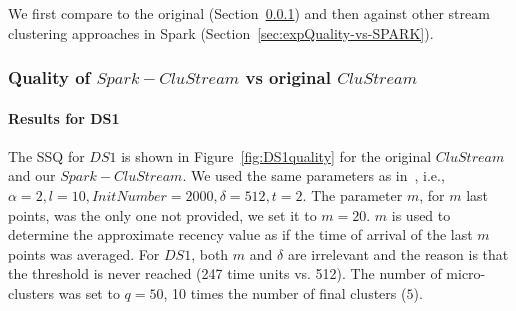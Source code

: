 We first compare \our to the original \clustream (Section~\ref{sec:expQuality-vs-CluStream}) and then against other stream clustering approaches in Spark (Section~\ref{sec:expQuality-vs-SPARK}).

\subsubsection{Quality of $Spark-CluStream$ vs original $CluStream$}
\label{sec:expQuality-vs-CluStream}
\paragraph{Results for DS1}

The SSQ for $DS1$ is shown in Figure~\ref{fig:DS1quality} for the original $CluStream$ and our $Spark-CluStream$.
We used the same parameters as in~\cite{clustreamOrig}, i.e., $\alpha=2,l=10,InitNumber=2000,\delta=512,t=2$.
The parameter $m$, for $m$ last points, was the only one not provided, we set it to $m=20$. $m$ is used to determine the approximate recency value as if the time of arrival of the last $m$ points was averaged.
For $DS1$, both $m$ and $\delta$ are irrelevant and the reason is that the threshold is never reached (247 time units vs. 512). 
The number of micro-clusters was set to $q=50$, 10 times the number of final clusters ($5$). 

